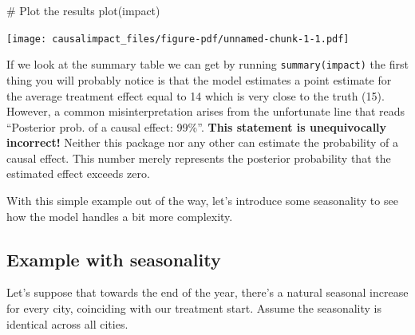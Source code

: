 \documentclass[
  letterpaper,
  DIV=11,
  numbers=noendperiod]{scrreprt}
\newenvironment{Shaded}{\begin{snugshade}}{\end{snugshade}}
\newcommand{\CommentTok}[1]{\textcolor[rgb]{0.37,0.37,0.37}{#1}}
\newcommand{\FunctionTok}[1]{\textcolor[rgb]{0.28,0.35,0.67}{#1}}
\newcommand{\NormalTok}[1]{\textcolor[rgb]{0.00,0.23,0.31}{#1}}
\begin{document}
\begin{Shaded}
\begin{Highlighting}[]
\CommentTok{\# Plot the results}
\FunctionTok{plot}\NormalTok{(impact)}
\end{Highlighting}
\end{Shaded}

\texttt{[image: causalimpact\_files/figure-pdf/unnamed-chunk-1-1.pdf]}

\begin{tcolorbox}[enhanced jigsaw, colframe=quarto-callout-important-color-frame, left=2mm, toprule=.15mm, colbacktitle=quarto-callout-important-color!10!white, title=\textcolor{quarto-callout-important-color}{\faExclamation}\hspace{0.5em}{Important}, coltitle=black, rightrule=.15mm, leftrule=.75mm, colback=white, arc=.35mm, bottomtitle=1mm, bottomrule=.15mm, breakable, titlerule=0mm, opacitybacktitle=0.6, toptitle=1mm, opacityback=0]

If we look at the summary table we can get by running
\texttt{summary(impact)} the first thing you will probably notice is
that the model estimates a point estimate for the average treatment
effect equal to 14 which is very close to the truth (15). However, a
common misinterpretation arises from the unfortunate line that reads
``Posterior prob. of a causal effect: 99\%''. \textbf{This statement is
unequivocally incorrect!} Neither this package nor any other can
estimate the probability of a causal effect. This number merely
represents the posterior probability that the estimated effect exceeds
zero.

\end{tcolorbox}

With this simple example out of the way, let's introduce some
seasonality to see how the model handles a bit more complexity.

\subsection{Example with seasonality}\label{example-with-seasonality}

Let's suppose that towards the end of the year, there's a natural
seasonal increase for every city, coinciding with our treatment start.
Assume the seasonality is identical across all cities.
\end{document}
